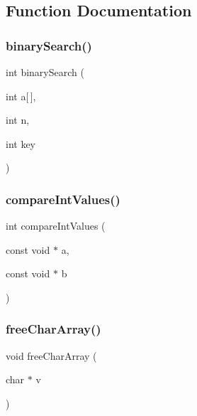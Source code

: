 \subsection{Function Documentation}
\label{lib__util_8c_a06ff287e8cdb6846b060b0824ee79e50} 
\subsubsection{binary\+Search()}
{\footnotesize\ttfamily int binary\+Search (\begin{DoxyParamCaption}\item[{int}]{a[$\,$],  }\item[{int}]{n,  }\item[{int}]{key }\end{DoxyParamCaption})}

\label{lib__util_8c_a0332554d07bfa6f16c72bf25a812f4b1} 
\subsubsection{compare\+Int\+Values()}
{\footnotesize\ttfamily int compare\+Int\+Values (\begin{DoxyParamCaption}\item[{const void $\ast$}]{a,  }\item[{const void $\ast$}]{b }\end{DoxyParamCaption})}

\label{lib__util_8c_a6696c76d3d7686350903547f51165d67} 
\subsubsection{free\+Char\+Array()}
{\footnotesize\ttfamily void free\+Char\+Array (\begin{DoxyParamCaption}\item[{char $\ast$}]{v }\end{DoxyParamCaption})}

\label{lib__util_8c_a6e2f0bf3d35dd28d0d3e28953f745556} 
